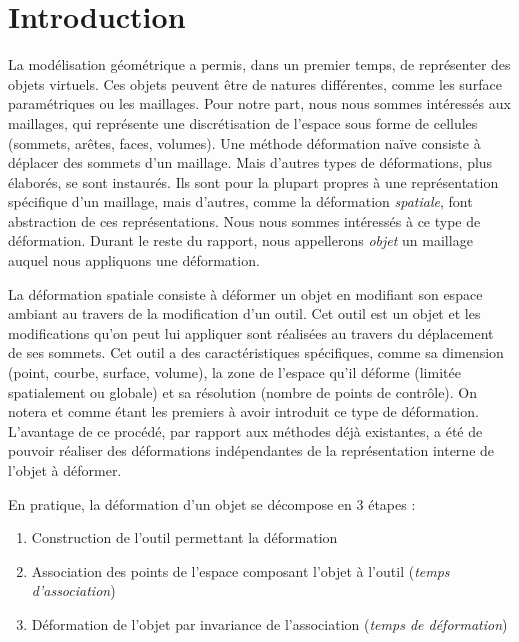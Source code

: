 
\chapter{Introduction}

\graphicspath{ {Introduction/IntroductionFigs/PNG/}
  {Introduction/IntroductionFigs/PDF/}
  {Introduction/IntroductionFigs/} }

La modélisation géométrique a permis, dans un premier temps, de représenter
des objets virtuels. Ces objets peuvent être de natures différentes, comme les
surface paramétriques ou les maillages. Pour notre part, nous nous sommes
intéressés aux maillages, qui représente une discrétisation de l'espace sous
forme de cellules (sommets, arêtes, faces, volumes). Une méthode déformation
naïve consiste à déplacer des sommets d'un maillage. Mais d'autres types de
déformations, plus élaborés, se sont instaurés. Ils sont pour la plupart
propres à une représentation spécifique d'un maillage, mais d'autres, comme la
déformation \textit{spatiale}, font abstraction de ces représentations. Nous
nous sommes intéressés à ce type de déformation. Durant le reste du rapport,
nous appellerons \textit{objet} un maillage auquel nous appliquons une
déformation.
	
La déformation spatiale consiste à déformer un objet en modifiant son espace
ambiant au travers de la modification d'un outil. Cet outil est un objet et
les modifications qu'on peut lui appliquer sont réalisées au travers du
déplacement de ses sommets. Cet outil a des caractéristiques spécifiques,
comme sa dimension (point, courbe, surface, volume), la zone de l'espace qu'il
déforme (limitée spatialement ou globale) et sa résolution (nombre de points
de contrôle). On notera \cite{Bar84} et \cite{SP86} comme étant les premiers à
avoir introduit ce type de déformation. L'avantage de ce procédé, par rapport
aux méthodes déjà existantes, a été de pouvoir réaliser des déformations
indépendantes de la représentation interne de l'objet à déformer.

\newpage

En pratique, la déformation d'un objet se décompose en 3 étapes :
\begin{enumerate}

\item Construction de l'outil permettant la déformation

\item Association des points de l'espace composant l'objet à l'outil
(\textit{temps d'association})

\item Déformation de l'objet par invariance de l'association (\textit{temps de
déformation})

\end{enumerate} 

